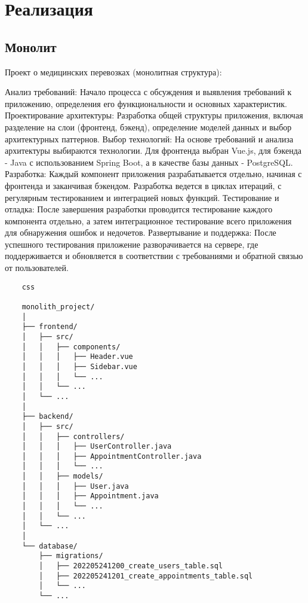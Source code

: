 \section{Реализация}

\subsection{Монолит}
    Проект о медицинских перевозках (монолитная структура):

    Анализ требований: Начало процесса с обсуждения и выявления требований к приложению, определения его функциональности и основных характеристик.
    Проектирование архитектуры: Разработка общей структуры приложения, включая разделение на слои (фронтенд, бэкенд), определение моделей данных и выбор архитектурных паттернов.
    Выбор технологий: На основе требований и анализа архитектуры выбираются технологии. Для фронтенда выбран Vue.js, для бэкенда - Java с использованием Spring Boot, а в качестве базы данных - PostgreSQL.
    Разработка: Каждый компонент приложения разрабатывается отдельно, начиная с фронтенда и заканчивая бэкендом. Разработка ведется в циклах итераций, с регулярным тестированием и интеграцией новых функций.
    Тестирование и отладка: После завершения разработки проводится тестирование каждого компонента отдельно, а затем интеграционное тестирование всего приложения для обнаружения ошибок и недочетов.
    Развертывание и поддержка: После успешного тестирования приложение разворачивается на сервере, где поддерживается и обновляется в соответствии с требованиями и обратной связью от пользователей.

    \begin{lstlisting}
    css
    
    monolith_project/
    │
    ├── frontend/
    │   ├── src/
    │   │   ├── components/
    │   │   │   ├── Header.vue
    │   │   │   ├── Sidebar.vue
    │   │   │   └── ...
    │   │   └── ...
    │   └── ...
    │
    ├── backend/
    │   ├── src/
    │   │   ├── controllers/
    │   │   │   ├── UserController.java
    │   │   │   ├── AppointmentController.java
    │   │   │   └── ...
    │   │   ├── models/
    │   │   │   ├── User.java
    │   │   │   ├── Appointment.java
    │   │   │   └── ...
    │   │   └── ...
    │   └── ...
    │
    └── database/
        ├── migrations/
        │   ├── 202205241200_create_users_table.sql
        │   ├── 202205241201_create_appointments_table.sql
        │   └── ...
        └── ...
    \end{lstlisting}
    
